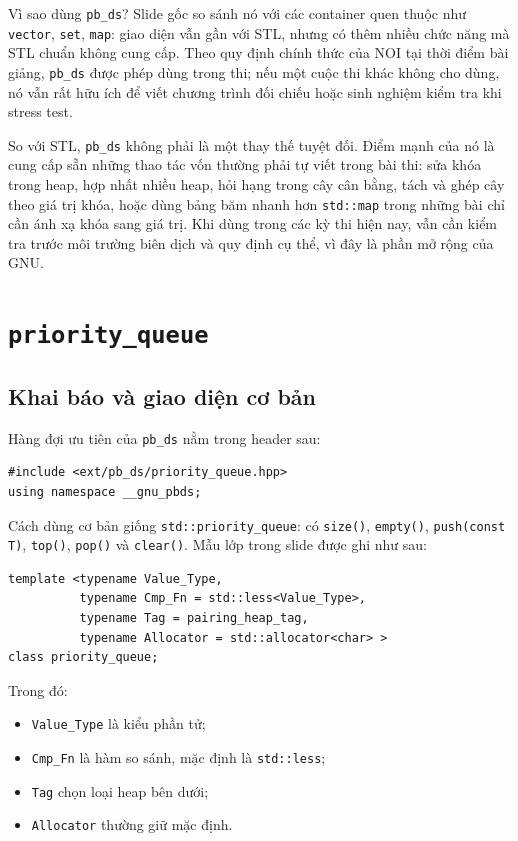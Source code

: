 \documentclass[11pt]{article}
\begin{document}
Vì sao dùng \texttt{pb\_ds}? Slide gốc so sánh nó với các container quen thuộc
như \texttt{vector}, \texttt{set}, \texttt{map}: giao diện vẫn gần với STL,
nhưng có thêm nhiều chức năng mà STL chuẩn không cung cấp. Theo quy định chính
thức của NOI tại thời điểm bài giảng, \texttt{pb\_ds} được phép dùng trong
thi; nếu một cuộc thi khác không cho dùng, nó vẫn rất hữu ích để viết chương
trình đối chiếu hoặc sinh nghiệm kiểm tra khi stress test.

So với STL, \texttt{pb\_ds} không phải là một thay thế tuyệt đối. Điểm mạnh của
nó là cung cấp sẵn những thao tác vốn thường phải tự viết trong bài thi: sửa
khóa trong heap, hợp nhất nhiều heap, hỏi hạng trong cây cân bằng, tách và
ghép cây theo giá trị khóa, hoặc dùng bảng băm nhanh hơn \texttt{std::map}
trong những bài chỉ cần ánh xạ khóa sang giá trị. Khi dùng trong các kỳ thi
hiện nay, vẫn cần kiểm tra trước môi trường biên dịch và quy định cụ thể, vì
đây là phần mở rộng của GNU.

\section{\texorpdfstring{\texttt{priority\_queue}}{priority queue}}

\subsection{Khai báo và giao diện cơ bản}

Hàng đợi ưu tiên của \texttt{pb\_ds} nằm trong header sau:

\begin{verbatim}
#include <ext/pb_ds/priority_queue.hpp>
using namespace __gnu_pbds;
\end{verbatim}

Cách dùng cơ bản giống \texttt{std::priority\_queue}: có
\texttt{size()}, \texttt{empty()}, \texttt{push(const T)}, \texttt{top()},
\texttt{pop()} và \texttt{clear()}. Mẫu lớp trong slide được ghi như sau:

\begingroup
\small
\begin{verbatim}
template <typename Value_Type,
          typename Cmp_Fn = std::less<Value_Type>,
          typename Tag = pairing_heap_tag,
          typename Allocator = std::allocator<char> >
class priority_queue;
\end{verbatim}
\endgroup

Trong đó:
\begin{itemize}
  \item \texttt{Value\_Type} là kiểu phần tử;
  \item \texttt{Cmp\_Fn} là hàm so sánh, mặc định là \texttt{std::less};
  \item \texttt{Tag} chọn loại heap bên dưới;
  \item \texttt{Allocator} thường giữ mặc định.
\end{itemize}
\end{document}
